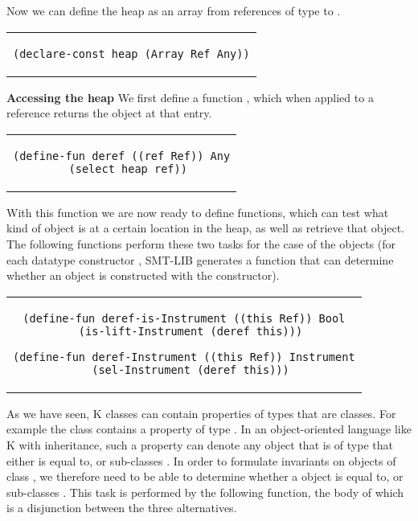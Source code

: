 \noindent Now we can define the heap as an array from references of
type  to .

\begin{center}
\begin{tabular}{c}
\begin{lstlisting}
(declare-const heap (Array Ref Any))
\end{lstlisting}
\end{tabular}
\end{center}

\textbf{Accessing the heap} We first define a function ,
which when applied to a reference returns the  object at
that entry.

\begin{center}
\begin{tabular}{c}
\begin{lstlisting}
(define-fun deref ((ref Ref)) Any
  (select heap ref))
\end{lstlisting}
\end{tabular}
\end{center}

With this function we are now ready to define functions, which can test
what kind of object is at a certain location in the heap, as well as
retrieve that object. The following functions perform these two tasks
for the case of the  objects (for each datatype
constructor , SMT-LIB generates a  function that
can determine whether an object is constructed with the constructor).

\begin{center}
\begin{tabular}{c}
\begin{lstlisting}
(define-fun deref-is-Instrument ((this Ref)) Bool
  (is-lift-Instrument (deref this)))

(define-fun deref-Instrument ((this Ref)) Instrument
  (sel-Instrument (deref this)))
\end{lstlisting}
\end{tabular}
\end{center}

As we have seen, K classes can contain properties of types that are
classes. For example the  class contains a property
 of type . In an object-oriented language
like K with inheritance, such a property can denote any object that is
of type that either is equal to, or sub-classes . In
order to formulate invariants on objects of class ,
we therefore need to be able to determine whether a  object is equal
to, or sub-classes . This task is performed by the
following function, the body of which is a disjunction between the
three alternatives.

